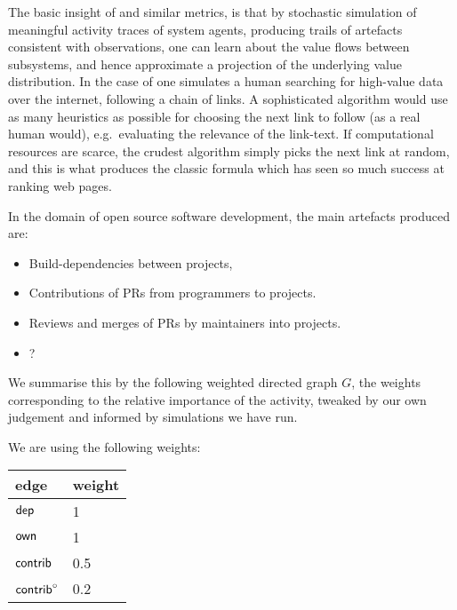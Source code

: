 The basic insight of \pagerank{} and similar metrics, is that by
stochastic simulation of meaningful activity traces of system agents,
producing trails of artefacts consistent with observations, one can
learn about the value flows between subsystems, and hence approximate
a projection of the underlying value distribution. In the case of
\pagerank{} one simulates a human searching for high-value data over
the internet, following a chain of links. A sophisticated algorithm
would use as many heuristics as possible for choosing the next link to
follow (as a real human would), e.g.\ evaluating the relevance of the
link-text. If computational resources are scarce, the crudest
algorithm simply picks the next link at random, and this is what
produces the classic \pagerank{} formula which has seen so much
success at ranking web pages.

In the domain of open source software development, the main artefacts
produced are:
\begin{itemize}
  \item Build-dependencies between projects,
  \item Contributions of PRs from programmers to projects.
  \item Reviews and merges of PRs by maintainers into projects.
  \item ? %
\end{itemize}

We summarise this by the following weighted directed graph $G$, the
weights corresponding to the relative importance of the activity,
tweaked by our own judgement and informed by simulations we have run.


We are using the following weights:
\begin{center}
  \begin{tabular}{ll}
  edge & weight \\
  \hline
  $\mathsf{dep}$ & 1 \\
  $\mathsf{own}$ & 1 \\
  $\mathsf{contrib}$ & 0.5 \\
  $\mathsf{contrib}^\circ$ & 0.2
  \end{tabular}
\end{center}


